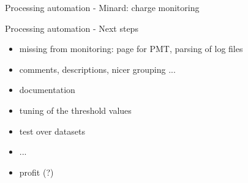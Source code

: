 \documentclass[xcolor=table]{beamer}
\begin{document}
\begin{frame}{Processing automation - Minard: charge monitoring}
\noindent{}
\end{frame}

\begin{frame}{Processing automation - Next steps}
\begin{itemize}
	\item missing from monitoring: page for PMT, parsing of log files
	\item comments, descriptions, nicer grouping ...
	\item documentation
	\item tuning of the threshold values
	\item test over datasets
	\item ...
	\item profit (?)
\end{itemize}
\end{frame}
\end{document}
